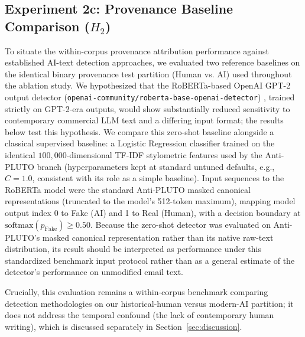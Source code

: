 \documentclass[journal]{IEEEtran}
\begin{document}
\subsection{Experiment 2c: Provenance Baseline Comparison ($H_2$)}
To situate the within-corpus provenance attribution performance against established AI-text detection approaches, we evaluated two reference baselines on the identical binary provenance test partition (Human vs. AI) used throughout the ablation study. We hypothesized that the RoBERTa-based OpenAI GPT-2 output detector (\texttt{openai-community/roberta-base-openai-detector}) \cite{solaiman2019release}, trained strictly on GPT-2-era outputs, would show substantially reduced sensitivity to contemporary commercial LLM text and a differing input format; the results below test this hypothesis. We compare this zero-shot baseline alongside a classical supervised baseline: a Logistic Regression classifier trained on the identical $100,000$-dimensional TF-IDF stylometric features used by the Anti-PLUTO branch (hyperparameters kept at standard untuned defaults, e.g., $C=1.0$, consistent with its role as a simple baseline). Input sequences to the RoBERTa model were the standard Anti-PLUTO masked canonical representations (truncated to the model's 512-token maximum), mapping model output index 0 to Fake (AI) and 1 to Real (Human), with a decision boundary at $\text{softmax}(p_{\text{Fake}}) \ge 0.50$. Because the zero-shot detector was evaluated on Anti-PLUTO's masked canonical representation rather than its native raw-text distribution, its result should be interpreted as performance under this standardized benchmark input protocol rather than as a general estimate of the detector's performance on unmodified email text.

Crucially, this evaluation remains a within-corpus benchmark comparing detection methodologies on our historical-human versus modern-AI partition; it does not address the temporal confound (the lack of contemporary human writing), which is discussed separately in Section~\ref{sec:discussion}.
\end{document}

